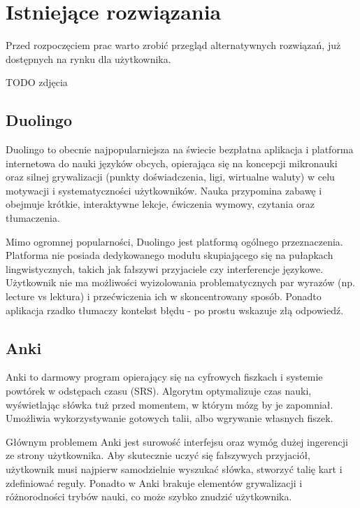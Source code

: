 \documentclass[polish]{aghengthesis}
\begin{document}
\section{Istniejące rozwiązania}
Przed rozpoczęciem prac warto zrobić przegląd alternatywnych rozwiązań, już
dostępnych na rynku dla użytkownika.

TODO zdjęcia

\subsection{Duolingo}
Duolingo \cite{duolingo} to obecnie najpopularniejsza na świecie bezpłatna aplikacja i platforma
internetowa do nauki języków obcych, opierająca się na koncepcji mikronauki oraz
silnej grywalizacji (punkty doświadczenia, ligi, wirtualne waluty) w celu motywacji
i systematyczności użytkowników. Nauka przypomina zabawę i obejmuje krótkie,
interaktywne lekcje, ćwiczenia wymowy, czytania oraz tłumaczenia.

Mimo ogromnej popularności, Duolingo jest platformą ogólnego przeznaczenia.
Platforma nie posiada dedykowanego modułu skupiającego się na pułapkach
lingwistycznych, takich jak fałszywi przyjaciele czy interferencje językowe.
Użytkownik nie ma możliwości wyizolowania problematycznych par wyrazów (np.
lecture vs lektura) i przećwiczenia ich w skoncentrowany sposób. Ponadto aplikacja
rzadko tłumaczy kontekst błędu - po prostu wskazuje złą odpowiedź.

\subsection{Anki}
Anki \cite{anki} to darmowy program opierający się na cyfrowych fiszkach i systemie powtórek
w odstępach czasu (SRS). Algorytm optymalizuje czas nauki, wyświetlając słówka
tuż przed momentem, w którym mózg by je zapomniał. Umożliwia wykorzystywanie
gotowych talii, albo wgrywanie własnych fiszek.

Głównym problemem Anki jest surowość interfejsu oraz wymóg dużej ingerencji ze
strony użytkownika. Aby skutecznie uczyć się fałszywych przyjaciół, użytkownik
musi najpierw samodzielnie wyszukać słówka, stworzyć talię kart i zdefiniować
reguły. Ponadto w Anki brakuje elementów grywalizacji i różnorodności trybów nauki,
co może szybko znudzić użytkownika.

\end{document}
